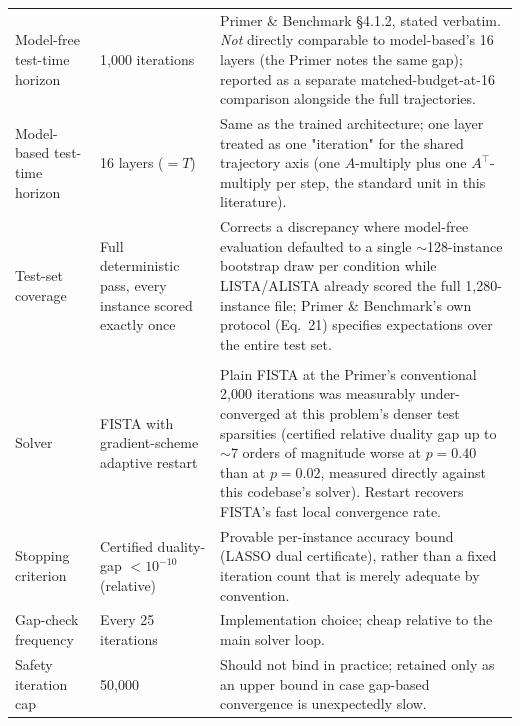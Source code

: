 \begin{longtable}{@{} l l p{7.6cm} @{}}
\addlinespace
\multicolumn{3}{@{}l}{\textbf{Evaluation protocol (all methods)}} \\
\midrule
Model-free test-time horizon & 1{,}000 iterations & Primer \& Benchmark \S4.1.2, stated verbatim. \emph{Not} directly comparable to model-based's 16 layers (the Primer notes the same gap); reported as a separate matched-budget-at-16 comparison alongside the full trajectories. \\
Model-based test-time horizon & 16 layers ($=T$) & Same as the trained architecture; one layer treated as one "iteration" for the shared trajectory axis (one $A$-multiply plus one $A^\top$-multiply per step, the standard unit in this literature). \\
Test-set coverage & Full deterministic pass, every instance scored exactly once & Corrects a discrepancy where model-free evaluation defaulted to a single $\sim$128-instance bootstrap draw per condition while LISTA/ALISTA already scored the full 1{,}280-instance file; Primer \& Benchmark's own protocol (Eq.~21) specifies expectations over the entire test set. \\

\addlinespace
\multicolumn{3}{@{}l}{\textbf{Reference solution (all methods' recovery metrics)}} \\
\midrule
Solver & FISTA with gradient-scheme adaptive restart & Plain FISTA at the Primer's conventional 2{,}000 iterations was measurably under-converged at this problem's denser test sparsities (certified relative duality gap up to $\sim$7 orders of magnitude worse at $p=0.40$ than at $p=0.02$, measured directly against this codebase's solver). Restart recovers FISTA's fast local convergence rate. \\
Stopping criterion & Certified duality-gap $< 10^{-10}$ (relative) & Provable per-instance accuracy bound (LASSO dual certificate), rather than a fixed iteration count that is merely adequate by convention. \\
Gap-check frequency & Every 25 iterations & Implementation choice; cheap relative to the main solver loop. \\
Safety iteration cap & 50{,}000 & Should not bind in practice; retained only as an upper bound in case gap-based convergence is unexpectedly slow. \\

\end{longtable}

